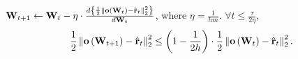 	\begin{lem}
		\label{lem:logit_l2_loss_parameter_smoothness}
		${\mathbf{W}}_{t+1} \leftarrow {\mathbf{W}}_t - \eta \cdot \frac{d \left\{ \frac{1}{2} \left\| {\mathbf{o}}\left( {\mathbf{W}}_t\right) - \hat{{\mathbf{r}}}_t \right\|_2^2 \right\}}{d {\mathbf{W}}_t}$, where $\eta = \frac{1}{h m}$. $\forall t \le \frac{\tau}{2 \eta}$,
		\begin{equation*}
		\begin{split}
		\frac{1}{2} \left\| {\mathbf{o}}\left( {\mathbf{W}}_{t+1} \right) - \hat{{\mathbf{r}}}_t \right\|_2^2 \le \left( 1 - \frac{1}{2 h} \right) \cdot \frac{1}{2} \left\| {\mathbf{o}}\left( {\mathbf{W}}_t \right) - \hat{{\mathbf{r}}}_t \right\|_2^2.
		\end{split}
		\end{equation*}
	\end{lem}